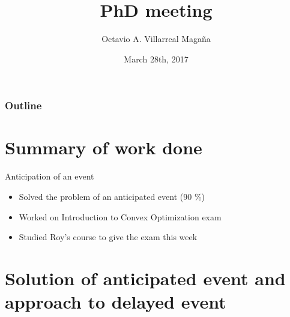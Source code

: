 \documentclass{beamer}
\title[PhD meeting: Planning and Control]{PhD meeting \vspace{15pt}}
\institute[]{Istituto Italiano di Tecnologia, Genova, Italy \vspace{20pt}}
\author{Octavio A. Villarreal Maga\~na \vspace{20pt}} %
\date{March 28th, 2017}
\newcommand*\titleTOC{Outline}
\begin{document}
{
\frame{\titlepage}
\begin{frame}\frametitle{\titleTOC}
	\tableofcontents
\end{frame}
}

{
}

\section{Summary of work done}

\begin{frame}{Anticipation of an event}
	\begin{itemize}\setlength\itemsep{3em}
		\item Solved the problem of an anticipated event (90 \%)
		\item Worked on Introduction to Convex Optimization exam
		\item Studied Roy's course to give the exam this week
	\end{itemize}
\end{frame}

\section{Solution of anticipated event and approach to delayed event}
\end{document}
